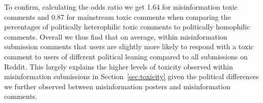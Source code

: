 To confirm, calculating the odds ratio we get 1.64 for misinformation toxic comments and  0.87 for mainstream toxic comments when comparing the percentages of politically heterophilic toxic comments to politically homophilic comments. Overall we thus find that on average, within misinformation submission comments that users are slightly more likely to respond with a toxic comment to users of different political leaning compared to all submissions on Reddit. This largely explains the higher levels of toxicity observed within misinformation submissions in Section~\ref{sec:toxicity} given the political differences we further observed between misinformation posters and misinformation comments.
 \begin{figure}
    \centering
    \begin{subfigure}{.4\textwidth}
       \centering
\begin{minipage}[c]{\textwidth}
   \centering
{}
\end{minipage}
\end{subfigure}
\end{figure}
